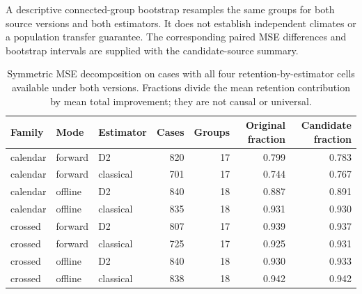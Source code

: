 A descriptive connected-group bootstrap resamples the same groups for both source versions and both estimators. It does not establish independent climates or a population transfer guarantee. The corresponding paired MSE differences and bootstrap intervals are supplied with the candidate-source summary.
\begin{table}[p]\centering\small
\caption{Symmetric MSE decomposition on cases with all four retention-by-estimator cells available under both versions. Fractions divide the mean retention contribution by mean total improvement; they are not causal or universal.}\label{tab:source-filter-factorial}
\begin{tabular}{lllrrrr}\toprule
Family & Mode & Estimator & Cases & Groups & Original fraction & Candidate fraction\\\midrule
calendar & forward & D2 & 820 & 17 & 0.799 & 0.783\\
calendar & forward & classical & 701 & 17 & 0.744 & 0.767\\
calendar & offline & D2 & 840 & 18 & 0.887 & 0.891\\
calendar & offline & classical & 835 & 18 & 0.931 & 0.930\\
crossed & forward & D2 & 807 & 17 & 0.939 & 0.937\\
crossed & forward & classical & 725 & 17 & 0.925 & 0.931\\
crossed & offline & D2 & 840 & 18 & 0.930 & 0.933\\
crossed & offline & classical & 838 & 18 & 0.942 & 0.942\\
\bottomrule\end{tabular}
\end{table}

